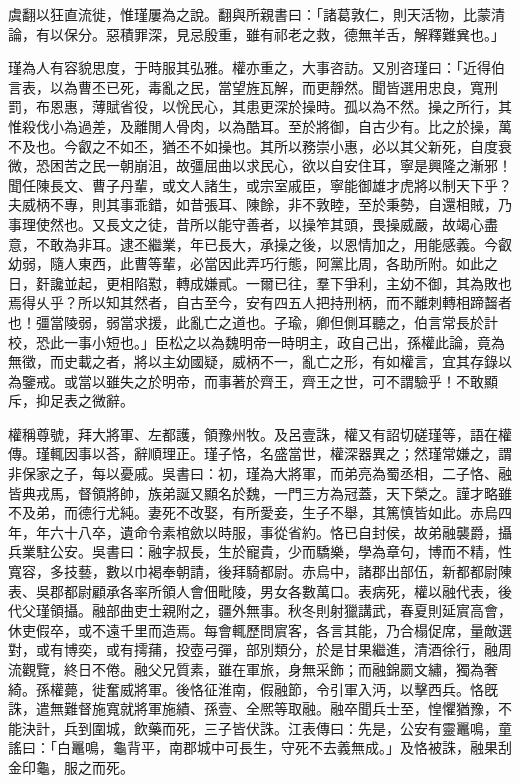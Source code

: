\begin{pinyinscope}
虞翻以狂直流徙，惟瑾屢為之說。翻與所親書曰：「諸葛敦仁，則天活物，比蒙清論，有以保分。惡積罪深，見忌殷重，雖有祁老之救，德無羊舌，解釋難兾也。」

瑾為人有容貌思度，于時服其弘雅。權亦重之，大事咨訪。又別咨瑾曰：「近得伯言表，以為曹丕已死，毒亂之民，當望旌瓦解，而更靜然。聞皆選用忠良，寬刑罰，布恩惠，薄賦省役，以恱民心，其患更深於操時。孤以為不然。操之所行，其惟殺伐小為過差，及離閒人骨肉，以為酷耳。至於將御，自古少有。比之於操，萬不及也。今叡之不如丕，猶丕不如操也。其所以務崇小惠，必以其父新死，自度衰微，恐困苦之民一朝崩沮，故彊屈曲以求民心，欲以自安住耳，寧是興隆之漸邪！聞任陳長文、曹子丹輩，或文人諸生，或宗室戚臣，寧能御雄才虎將以制天下乎？夫威柄不專，則其事乖錯，如昔張耳、陳餘，非不敦睦，至於秉勢，自還相賊，乃事理使然也。又長文之徒，昔所以能守善者，以操笮其頭，畏操威嚴，故竭心盡意，不敢為非耳。逮丕繼業，年已長大，承操之後，以恩情加之，用能感義。今叡幼弱，隨人東西，此曹等輩，必當因此弄巧行態，阿黨比周，各助所附。如此之日，姧讒並起，更相陷懟，轉成嫌貳。一爾已往，羣下爭利，主幼不御，其為敗也焉得乆乎？所以知其然者，自古至今，安有四五人把持刑柄，而不離刺轉相蹄齧者也！彊當陵弱，弱當求援，此亂亡之道也。子瑜，卿但側耳聽之，伯言常長於計校，恐此一事小短也。」臣松之以為魏明帝一時明主，政自己出，孫權此論，竟為無徵，而史載之者，將以主幼國疑，威柄不一，亂亡之形，有如權言，宜其存錄以為鑒戒。或當以雖失之於明帝，而事著於齊王，齊王之世，可不謂驗乎！不敢顯斥，抑足表之微辭。

權稱尊號，拜大將軍、左都護，領豫州牧。及呂壹誅，權又有詔切磋瑾等，語在權傳。瑾輒因事以荅，辭順理正。瑾子恪，名盛當世，權深器異之；然瑾常嫌之，謂非保家之子，每以憂戚。吳書曰：初，瑾為大將軍，而弟亮為蜀丞相，二子恪、融皆典戎馬，督領將帥，族弟誕又顯名於魏，一門三方為冠蓋，天下榮之。謹才略雖不及弟，而德行尤純。妻死不改娶，有所愛妾，生子不舉，其篤慎皆如此。赤烏四年，年六十八卒，遺命令素棺歛以時服，事從省約。恪已自封侯，故弟融襲爵，攝兵業駐公安。吳書曰：融字叔長，生於寵貴，少而驕樂，學為章句，博而不精，性寬容，多技藝，數以巾褐奉朝請，後拜騎都尉。赤烏中，諸郡出部伍，新都都尉陳表、吳郡都尉顧承各率所領人會佃毗陵，男女各數萬口。表病死，權以融代表，後代父瑾領攝。融部曲吏士親附之，疆外無事。秋冬則射獵講武，春夏則延賔高會，休吏假卒，或不遠千里而造焉。每會輒歷問賔客，各言其能，乃合榻促席，量敵選對，或有博奕，或有摴蒱，投壺弓彈，部別類分，於是甘果繼進，清酒徐行，融周流觀覽，終日不倦。融父兄質素，雖在軍旅，身無采飾；而融錦罽文繡，獨為奢綺。孫權薨，徙奮威將軍。後恪征淮南，假融節，令引軍入沔，以擊西兵。恪旣誅，遣無難督施寬就將軍施績、孫壹、全熈等取融。融卒聞兵士至，惶懼猶豫，不能決計，兵到圍城，飲藥而死，三子皆伏誅。江表傳曰：先是，公安有靈鼉鳴，童謠曰：「白鼉鳴，龜背平，南郡城中可長生，守死不去義無成。」及恪被誅，融果刮金印龜，服之而死。


\end{pinyinscope}